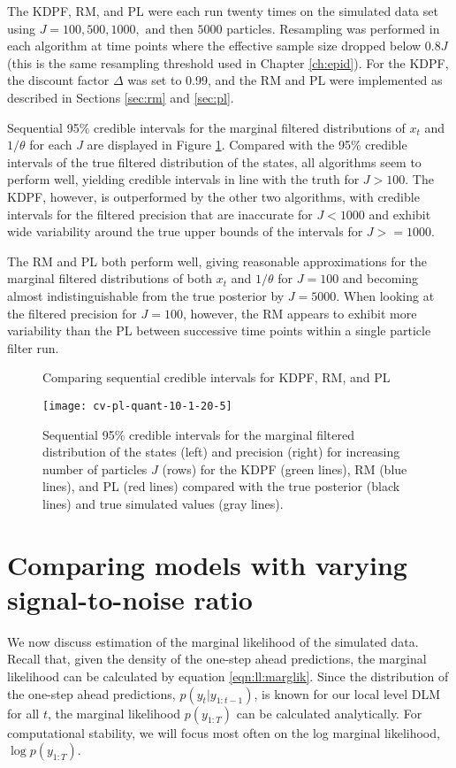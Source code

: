 The KDPF, RM, and PL were each run twenty times on the simulated data set using $J = 100, 500, 1000, \mbox{ and then } 5000$ particles. Resampling was performed in each algorithm at time points where the effective sample size dropped below $0.8J$ (this is the same resampling threshold used in Chapter \ref{ch:epid}). For the KDPF, the discount factor $\Delta$ was set to 0.99, and the RM and PL were implemented as described in Sections \ref{sec:rm} and \ref{sec:pl}.

Sequential 95\% credible intervals for the marginal filtered distributions of $x_t$ and $1/\theta$ for each $J$ are displayed in Figure \ref{fig:comp:quant}. Compared with the 95\% credible intervals of the true filtered distribution of the states, all algorithms seem to perform well, yielding credible intervals in line with the truth for $J > 100$. The KDPF, however, is outperformed by the other two algorithms, with credible intervals for the filtered precision that are inaccurate for $J < 1000$ and exhibit wide variability around the true upper bounds of the intervals for $J >= 1000$.

The RM and PL both perform well, giving reasonable approximations for the marginal filtered distributions of both $x_t$ and $1/\theta$ for $J = 100$ and becoming almost indistinguishable from the true posterior by $J = 5000$. When looking at the filtered precision for $J = 100$, however, the RM appears to exhibit more variability than the PL between successive time points within a single particle filter run.

\begin{figure}[ht]
\ssp
\centering
\caption{Comparing sequential credible intervals for KDPF, RM, and PL} \label{fig:comp:quant}
\texttt{[image: cv-pl-quant-10-1-20-5]}
\caption*{Sequential 95\% credible intervals for the marginal filtered distribution of the states (left) and precision (right) for increasing number of particles $J$ (rows) for the KDPF (green lines), RM (blue lines), and PL (red lines) compared with the true posterior (black lines) and true simulated values (gray lines).}
\end{figure}

\section{Comparing models with varying signal-to-noise ratio} \label{sec:comp:models}

We now discuss estimation of the marginal likelihood of the simulated data. Recall that, given the density of the one-step ahead predictions, the marginal likelihood can be calculated by equation \eqref{eqn:ll:marglik}. Since the distribution of the one-step ahead predictions, $p(y_t|y_{1:t-1})$, is known for our local level DLM for all $t$, the marginal likelihood $p(y_{1:T})$ can be calculated analytically. For computational stability, we will focus most often on the log marginal likelihood, $\log p(y_{1:T})$.

